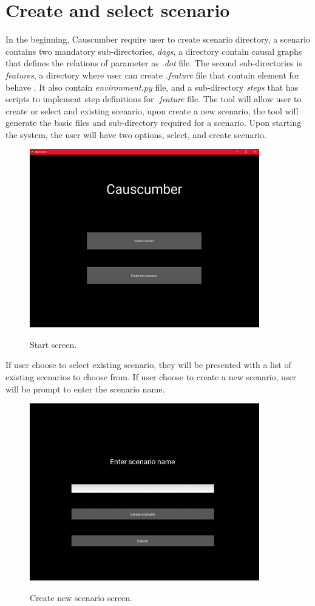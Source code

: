 \section{Create and select scenario}
In the beginning, Causcumber require user to create scenario directory, a scenario contains two mandatory sub-directories, \textsl{dags}, a directory contain causal graphs that defines the relations of parameter as \textsl{.dot} file. The second sub-directories is \textsl{features}, a directory where user can create \textsl{.feature} file that contain element for behave \cite{Reference21}. It also contain \textsl{environment.py} file, and a sub-directory \textsl{steps} that has scripts to implement step definitions for \textsl{.feature} file. The tool will allow user to create or select and existing scenario, upon create a new scenario, the tool will generate the basic files and sub-directory required for a scenario. Upon starting the system, the user will have two options, select, and create scenario.
\begin{figure}[H]
	\centering
	\includegraphics[width=10cm]{figures/startScreen.png}\\
	\caption{Start screen.}
	\label{fig:figure10}
\end{figure}
\noindent 
If user choose to select existing scenario, they will be presented with a list of existing scenarios to choose from. If user choose to create a new scenario, user will be prompt to enter the scenario name.
\begin{figure}[H]
	\centering
	\includegraphics[width=10cm]{figures/createNewScenario.png}\\
	\caption{Create new scenario screen.}
	\label{fig:figure11}
\end{figure}
